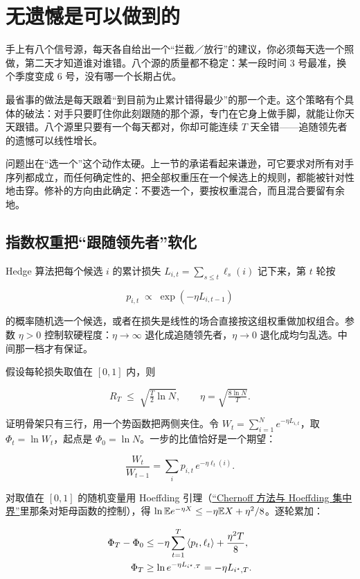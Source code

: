 \section{无遗憾是可以做到的}
\label{sec:17-Constrained-Guarantees/04-Online-Learning-and-Regret/02}

手上有八个信号源，每天各自给出一个``拦截／放行''的建议，你必须每天选一个照做，第二天才知道谁对谁错。八个源的质量都不稳定：某一段时间 3 号最准，换个季度变成 6 号，没有哪一个长期占优。

最省事的做法是每天跟着``到目前为止累计错得最少''的那一个走。这个策略有个具体的破法：对手只要盯住你此刻跟随的那个源，专门在它身上做手脚，就能让你天天跟错。八个源里只要有一个每天都对，你却可能连续 \(T\) 天全错——追随领先者的遗憾可以线性增长。

问题出在``选一个''这个动作太硬。上一节的承诺看起来谦逊，可它要求对所有对手序列都成立，而任何确定性的、把全部权重压在一个候选上的规则，都能被针对性地击穿。修补的方向由此确定：不要选一个，要按权重混合，而且混合要留有余地。

\subsection{指数权重把``跟随领先者''软化}

Hedge 算法把每个候选 \(i\) 的累计损失 \(L_{i,t}=\sum_{s\le t}\ell_s(i)\) 记下来，第 \(t\) 轮按

\[
p_{i,t}\;\propto\;\exp(-\eta L_{i,t-1})
\]

的概率随机选一个候选，或者在损失是线性的场合直接按这组权重做加权组合。参数 \(\eta>0\) 控制软硬程度：\(\eta\to\infty\) 退化成追随领先者，\(\eta\to0\) 退化成均匀乱选。中间那一档才有保证。

假设每轮损失取值在 \([0,1]\) 内，则

\[
R_T\;\le\;\sqrt{\tfrac{T}{2}\ln N},
\qquad \eta=\sqrt{\tfrac{8\ln N}{T}}.
\]

证明骨架只有三行，用一个势函数把两侧夹住。令 \(W_t=\sum_{i=1}^{N}e^{-\eta L_{i,t}}\)，取 \(\Phi_t=\ln W_t\)，起点是 \(\Phi_0=\ln N\)。一步的比值恰好是一个期望：

\[
\frac{W_t}{W_{t-1}}=\sum_{i}p_{i,t}\,e^{-\eta\ell_t(i)}.
\]

对取值在 \([0,1]\) 的随机变量用 Hoeffding 引理（\hyperref[sec:05-Probability/07-Transforms-and-Bounds/04]{``Chernoff 方法与 Hoeffding 集中界''}里那条对矩母函数的控制），得 \(\ln\mathbb{E} e^{-\eta X}\le-\eta\mathbb{E} X+\eta^2/8\)。逐轮累加：

\[
\begin{aligned}
\Phi_T-\Phi_0
&\le-\eta\sum_{t=1}^{T}\left\langle p_t,\ell_t\right\rangle+\frac{\eta^2T}{8},\\
\Phi_T&\ge\ln e^{-\eta L_{i^\star,T}}=-\eta L_{i^\star,T}.
\end{aligned}
\]

